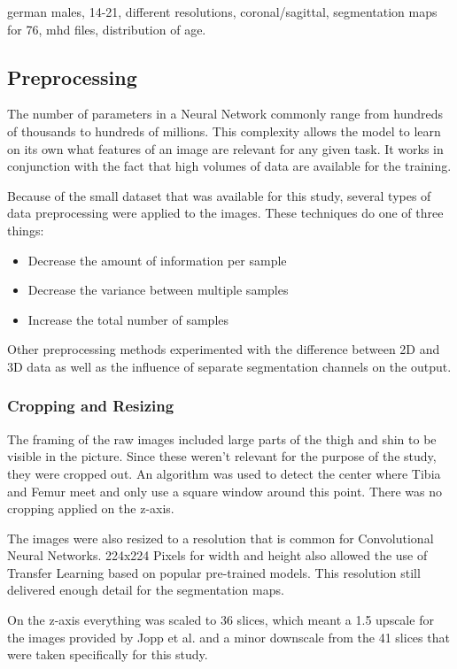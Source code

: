 german males, 14-21, different resolutions, coronal/sagittal, segmentation maps for 76, mhd files, distribution of age.



\subsection{Preprocessing}

The number of parameters in a Neural Network commonly range from hundreds of thousands to hundreds of millions. This complexity allows the model to learn on its own what features of an image are relevant for any given task. It works in conjunction with the fact that high volumes of data are available for the training.

Because of the small dataset that was available for this study, several types of data preprocessing were applied to the images. These techniques do one of three things:

\begin{itemize}
\item Decrease the amount of information per sample
\item Decrease the variance between multiple samples
\item Increase the total number of samples
\end{itemize}

Other preprocessing methods experimented with the difference between 2D and 3D data as well as the influence of separate segmentation channels on the output.

\subsubsection{Cropping and Resizing}

The framing of the raw images included large parts of the thigh and shin to be visible in the picture. Since these weren't relevant for the purpose of the study, they were cropped out. An algorithm was used to detect the center where Tibia and Femur meet and only use a square window around this point. There was no cropping applied on the z-axis.

The images were also resized to a resolution that is common for Convolutional Neural Networks. 224x224 Pixels for width and height also allowed the use of Transfer Learning based on popular pre-trained models. This resolution still delivered enough detail for the segmentation maps.

On the z-axis everything was scaled to 36 slices, which meant a 1.5 upscale for the images provided by Jopp et al. and a minor downscale from the 41 slices that were taken specifically for this study.

